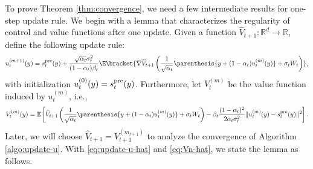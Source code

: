 \documentclass{article}
\newcommand{\R}{\mathbb{R}}
\begin{document}
To prove Theorem \ref{thm:convergence}, we need a few intermediate results for one-step update rule. We begin with a lemma that characterizes the regularity of control and value functions after one update. Given a function $\widehat{V}_{t+1}:\R^d \to \R$, define the following update rule:
    \begin{align}
    u_{t}^{(m+1)}(y) = s_{t}^{\rm pre}(y) + \frac{\sqrt{\alpha_{t}}\sigma_{t}^{2}}{(1 - \alpha_{t})\beta_t}\E\bracket{\nabla \widehat{V}_{t+1}\left(\frac{1}{\sqrt{\alpha_t}}\parenthesis{y + (1 - \alpha_t)u_t^{(m)}(y)} + \sigma_t W_t\right)}, \label{eq:update-u-hat}
    \end{align} 
    with initialization $u_{t}^{(0)}(y) = s_{t}^{\rm pre}(y)$. Furthermore, let $ V_{t}^{(m)} $ be the value function induced by $ u^{(m)}_{t} $, i.e., 
    \begin{align}
        V_{t}^{(m)}(y) = \mathbb{E}\left[\widehat{V}_{t+1}\left(\frac{1}{\sqrt{\alpha_t}}\parenthesis{y + (1 - \alpha_t)u_t^{(m)}(y)} + \sigma_t W_t\right) -\beta_t \frac{(1-\alpha_t)^2}{2\alpha_t \sigma_t^2}\|u_t^{(m)}(y)-s_t^{\rm pre}(y)\|^2\right]. \label{eq:Vn-hat}
    \end{align}
    Later, we will choose $\widehat{V}_{t+1} = V_{t+1}^{(m_{t+1})}$ to analyze the convergence of Algorithm \ref{algo:update-u}. With \eqref{eq:update-u-hat} and \eqref{eq:Vn-hat}, we state the lemma as follows. 
\end{document}
